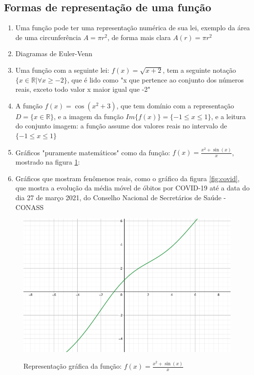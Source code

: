 \begin{multicols*}{2}
    \subsection*{Formas de representação de uma função}
    \begin{enumerate}[wide, labelwidth=!, labelindent=0pt]
        \item Uma função pode ter uma representação numérica de sua lei, exemplo da área de uma 						circunferência $A = \pi r^2$, de forma mais clara $A(r) = \pi r^2$
        \item Diagramas de Euler-Venn
        \item Uma função com a seguinte lei: $f(x) = \sqrt{x+2}$, tem a seguinte notação 						$ \{x \in \mathbb{R} | \forall x  \ge -2 \} $, que é lido como "x que pertence ao 						conjunto dos números reais, exceto todo valor x maior igual que -2"
        \item A função $f(x) = \cos(x^2 +3)$, que tem domínio com a representação
              $D = \{ x \in \mathbb{R} \}$, e a imagem da função $Im\{ f(x) \} =
                  \{ -1 \le x \le 1 \} $, e a leitura do conjunto imagem:  a função assume dos 						valores reais no intervalo de $\{ -1 \le x \le 1 \}$
        \item Gráficos "puramente matemáticos" como da função:
              $f(x) = \frac{ x^2 + \sin(x) }{x}$, mostrado na figura \ref{fig:func1}:
        \item Gráficos que mostram fenômenos reais, como o gráfico da figura \ref{fig:covid}, que mostra a evolução da média móvel de óbitos por COVID-19 até a data do dia 27 de março 2021, do 					Conselho Nacional de Secretários de Saúde - CONASS
    \end{enumerate}
    \begin{figure}[H]
        \centering
        \caption{Representação gráfica da função: $f(x) = \frac{ x^2 + \sin(x) }{x}$}
        \includegraphics[scale=0.3]{assets/rafael/img3.png}
        \label{fig:func1}
    \end{figure}


\end{multicols*}
